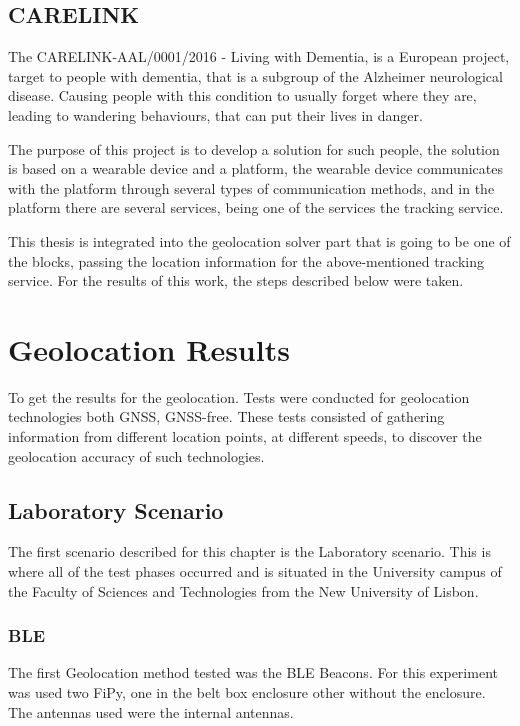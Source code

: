 \subsection{CARELINK} %
\label{sec:Use_case_CARELINK}
The CARELINK-AAL/0001/2016 - Living with Dementia, is a European project, target to people with dementia, that is a subgroup of the Alzheimer neurological disease.
Causing people with this condition to usually forget where they are, leading to wandering behaviours, that can put their lives in danger.

The purpose of this project is to develop a solution for such people, the solution is based on a wearable device and a platform, the wearable device communicates with the platform through several types of communication methods, and in the platform there are several services, being one of the services the tracking service. 

This thesis is integrated into the geolocation solver part that is going to be one of the blocks, passing the location information for the above-mentioned tracking service. For the results of this work, the steps described below were taken.
\newpage


\section{Geolocation Results}
\label{sec:Geolocation_Results}
To get the results for the geolocation. Tests were conducted for geolocation technologies both GNSS, GNSS-free. These tests consisted of gathering information from different location points, at different speeds, to discover the geolocation accuracy of such technologies. 

\subsection{Laboratory Scenario}
\label{subsec:laboratory}
The first scenario described for this chapter is the Laboratory scenario. This is where all of the test phases occurred and is situated in the University campus of the Faculty of Sciences and Technologies from the New University of Lisbon.

\subsubsection{BLE}
\label{subsubsec:Geo_BLE}
The first  Geolocation method tested was the BLE Beacons. For this experiment was used two FiPy, one in the belt box enclosure other without the enclosure. The antennas used were the internal antennas. 

